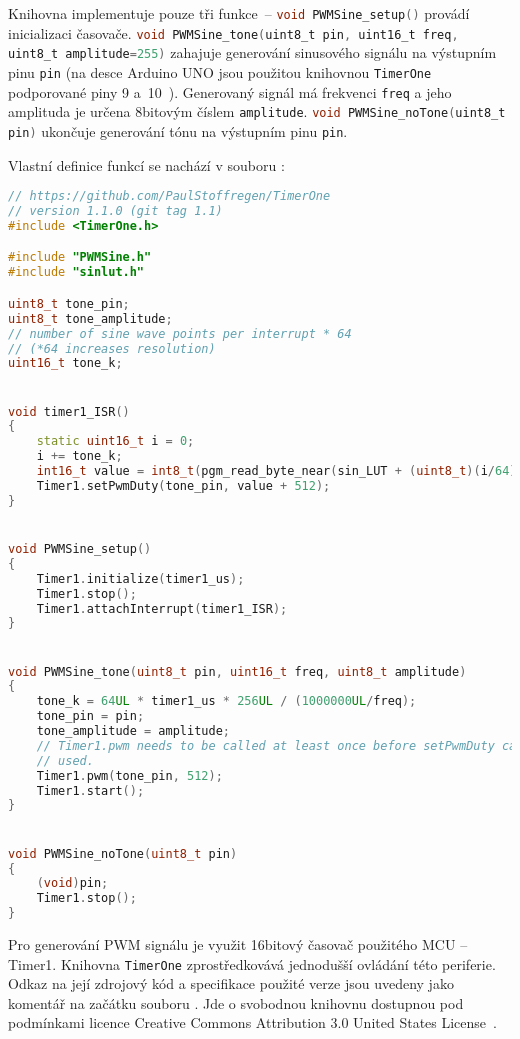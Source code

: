 Knihovna implementuje pouze tři funkce~--
\lstinline[language=C]!void PWMSine_setup()! provádí inicializaci časovače.
\lstinline[language=C]!void PWMSine_tone(uint8_t pin, uint16_t freq, uint8_t amplitude=255)!
zahajuje generování sinusového signálu na výstupním pinu \texttt{pin} (na desce
Arduino UNO jsou použitou knihovnou \texttt{TimerOne} podporované piny 9
a~10~\cite{TimerOnedocs}). Generovaný signál má frekvenci \texttt{freq} a jeho
amplituda je určena 8bitovým číslem \texttt{amplitude}.
\lstinline[language=C]!void PWMSine_noTone(uint8_t pin)! ukončuje generování
tónu na výstupním pinu \texttt{pin}.

Vlastní definice funkcí se nachází v souboru :
\begin{lstlisting}[language=C++,style=numbers]
// https://github.com/PaulStoffregen/TimerOne
// version 1.1.0 (git tag 1.1)
#include <TimerOne.h>

#include "PWMSine.h"
#include "sinlut.h"

uint8_t tone_pin;
uint8_t tone_amplitude;
// number of sine wave points per interrupt * 64
// (*64 increases resolution)
uint16_t tone_k;


void timer1_ISR()
{
    static uint16_t i = 0;
    i += tone_k;
    int16_t value = int8_t(pgm_read_byte_near(sin_LUT + (uint8_t)(i/64))) * tone_amplitude / 64;
    Timer1.setPwmDuty(tone_pin, value + 512);
}


void PWMSine_setup()
{
    Timer1.initialize(timer1_us);
    Timer1.stop();
    Timer1.attachInterrupt(timer1_ISR);
}


void PWMSine_tone(uint8_t pin, uint16_t freq, uint8_t amplitude)
{
    tone_k = 64UL * timer1_us * 256UL / (1000000UL/freq);
    tone_pin = pin;
    tone_amplitude = amplitude;
    // Timer1.pwm needs to be called at least once before setPwmDuty can be
    // used.
    Timer1.pwm(tone_pin, 512);
    Timer1.start();
}


void PWMSine_noTone(uint8_t pin)
{
    (void)pin;
    Timer1.stop();
}
\end{lstlisting}

Pro generování PWM signálu je využit 16bitový časovač použitého MCU -- Timer1.
Knihovna \texttt{TimerOne} zprostředkovává jednodušší ovládání této periferie.
Odkaz na její zdrojový kód a specifikace použité verze jsou uvedeny jako
komentář na začátku souboru . Jde o svobodnou knihovnu
dostupnou pod podmínkami licence
\foreignlanguage{english}{Creative Commons Attribution 3.0 United States
License}~\cite{TimerOnerepo}.

